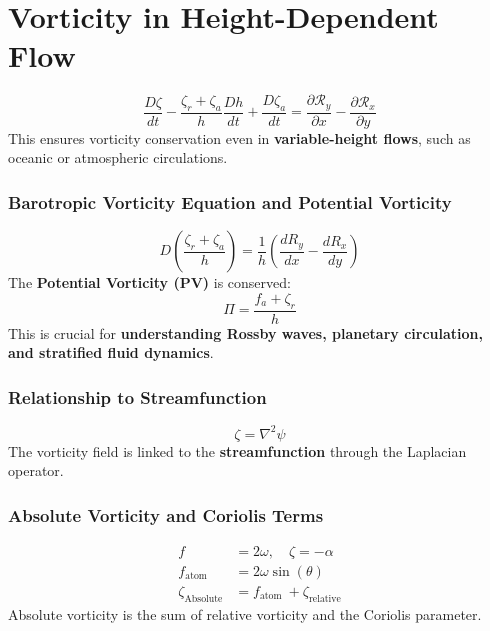     \section*{Vorticity in Height-Dependent Flow}
    \begin{equation*}
        \frac{D \zeta}{d t} - \frac{ \zeta_r + \zeta_a }{h}  \frac{D h}{d t} + \frac{D \zeta_a}{d t}  = \frac{\partial \mathcal{R}_y}{\partial x} - \frac{\partial \mathcal{R}_x}{\partial y}
    \end{equation*}
    This ensures vorticity conservation even in \textbf{variable-height flows}, such as oceanic or atmospheric circulations.

    \subsubsection*{Barotropic Vorticity Equation and Potential Vorticity}
    \begin{equation*}
        D\left(\frac{\zeta_r+\zeta_a}{h}\right)=\frac{1}{h}\left(\frac{d R_y}{d x}-\frac{d R_x}{d y}\right)
    \end{equation*}
    The \textbf{Potential Vorticity (PV)} is conserved:
    \begin{equation*}
        \Pi = \frac{f_a+\zeta_r}{h}
    \end{equation*}
    This is crucial for \textbf{understanding Rossby waves, planetary circulation, and stratified fluid dynamics}.

    \subsubsection*{Relationship to Streamfunction}
    \begin{equation*}
        \zeta = \nabla^2 \psi
    \end{equation*}
    The vorticity field is linked to the \textbf{streamfunction} through the Laplacian operator.

    \subsubsection*{Absolute Vorticity and Coriolis Terms}
    \begin{align}
        f &= 2 \omega, \quad \zeta=-\alpha \\
        f_\text{atom} &= 2 \omega \sin (\theta) \\
        \zeta_\text{Absolute} &= f_\text{atom }+\zeta_\text{relative}
    \end{align}
    Absolute vorticity is the sum of relative vorticity and the Coriolis parameter.

